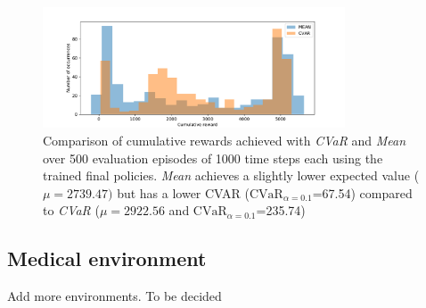 \begin{figure}[ht]
\centering
\includegraphics[width=0.8\textwidth]{images/Walker_offpolicy_expert/hist_evaluation_numevalsteps1000.pdf}
\caption{Comparison of cumulative rewards achieved with \textit{CVaR} and \textit{Mean}
over 500 evaluation episodes of 1000 time steps each using the trained final policies.
\textit{Mean} achieves a slightly lower expected value ($\mu=2739.47)$ but 
has a lower CVAR ($\text{CVaR}_{\alpha= 0.1}$=67.54) compared to
\textit{CVaR} ($\mu=2922.56$ and $\text{CVaR}_{\alpha= 0.1}$=235.74)}
\label{fig:hist_cum_rewards_walker}
\end{figure}

\clearpage
\subsection{Medical environment}
Add more environments. To be decided
